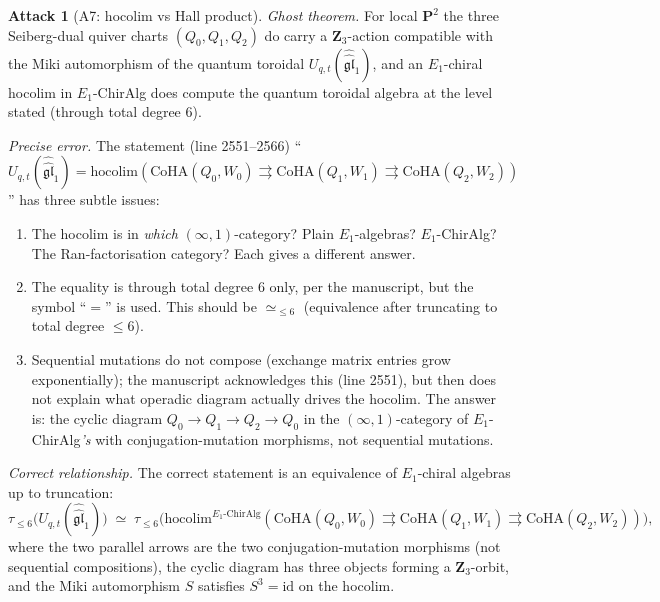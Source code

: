 \documentclass[11pt]{amsart}
\theoremstyle{definition}
\newtheorem{attack}{Attack}
\providecommand{\Eone}{E_1}
\providecommand{\fgl}{\mathfrak{gl}}
\providecommand{\bP}{\mathbf{P}}
\providecommand{\bZ}{\mathbf{Z}}
\providecommand{\CoHA}{\mathrm{CoHA}}
\begin{document}
\begin{attack}[A7: hocolim vs Hall product]\leavevmode

\noindent\emph{Ghost theorem.} For local $\bP^2$ the three Seiberg-dual
quiver charts $(Q_0, Q_1, Q_2)$ do carry a $\bZ_3$-action compatible
with the Miki automorphism of the quantum toroidal
$U_{q,t}(\widehat{\widehat{\fgl}}_1)$, and an $\Eone$-chiral hocolim in
$\Eone$-ChirAlg does compute the quantum toroidal algebra at the level
stated (through total degree 6).

\noindent\emph{Precise error.} The statement (line 2551--2566)
``$U_{q,t}(\widehat{\widehat{\fgl}}_1) = \mathrm{hocolim}(\CoHA(Q_0,W_0)
\rightrightarrows \CoHA(Q_1,W_1) \rightrightarrows \CoHA(Q_2,W_2))$''
has three subtle issues:

\begin{enumerate}[label=(\alph*)]
 \item The hocolim is in \emph{which} $(\infty,1)$-category? Plain
   $\Eone$-algebras? $\Eone$-ChirAlg? The Ran-factorisation category?
   Each gives a different answer.
 \item The equality is through total degree $6$ only, per the
   manuscript, but the symbol ``$=$'' is used. This should be
   $\simeq_{\leq 6}$ (equivalence after truncating to total degree
   $\leq 6$).
 \item Sequential mutations do not compose (exchange matrix
   entries grow exponentially); the manuscript acknowledges this
   (line 2551), but then does not explain what operadic diagram
   actually drives the hocolim. The answer is: the cyclic diagram
   $Q_0 \to Q_1 \to Q_2 \to Q_0$ in the $(\infty,1)$-category of
   $\Eone$-ChirAlg{\em's} with conjugation-mutation morphisms, not
   sequential mutations.
\end{enumerate}

\noindent\emph{Correct relationship.} The correct statement is an
equivalence of $\Eone$-chiral algebras up to truncation:
\[
 \tau_{\leq 6}\bigl(U_{q,t}(\widehat{\widehat{\fgl}}_1)\bigr)
 \;\simeq\;
 \tau_{\leq 6}\bigl(\mathrm{hocolim}^{\Eone\text{-ChirAlg}}
 (\CoHA(Q_0,W_0) \rightrightarrows \CoHA(Q_1,W_1)
 \rightrightarrows \CoHA(Q_2,W_2))\bigr),
\]
where the two parallel arrows are the two conjugation-mutation
morphisms (not sequential compositions), the cyclic diagram has three
objects forming a $\bZ_3$-orbit, and the Miki automorphism $S$
satisfies $S^3 = \mathrm{id}$ on the hocolim.
\end{attack}
\end{document}

